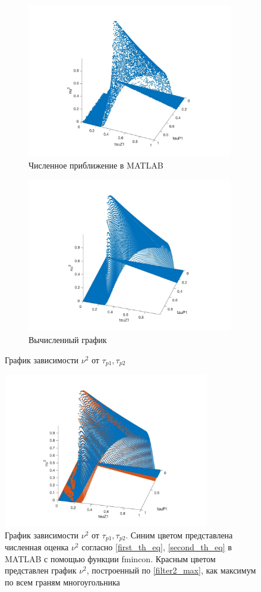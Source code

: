 \documentclass[a4paper,14pt]{article} %
\begin{document}
  \begin{figure}[H]
\begin{subfigure}{.5\textwidth}
  \includegraphics[width=9cm]{images/filter2_tau0_1e.jpg}
  \caption{Численное приближение в MATLAB}
  \label{filter2:sub1}
\end{subfigure}%
 \begin{subfigure}{.5\textwidth}
  \includegraphics[width=9cm]{images/filter2_tau0_1.jpg}
  \caption{Вычисленный график}
  \label{filter2:sub2}
\end{subfigure}%
\caption{График зависимости $\nu^2$ от $\tau_{p1}, \tau_{p2}$}
\label{filter2:filter2_fig}
\end{figure}

\begin{figure}[H]
\includegraphics[width=9cm]{images/main.jpg}
\caption{График зависимости $\nu^2$ от $\tau_{p1}, \tau_{p2}$. Синим цветом представлена численная оценка $\nu^2$ согласно \eqref{first_th_eq}, \eqref{second_th_eq} в MATLAB с помощью функции fmincon. Красным цветом представлен график $\nu^2$, построенный по \eqref{filter2_max}, как максимум по всем граням многоугольника}
\end{figure}
\end{document}
